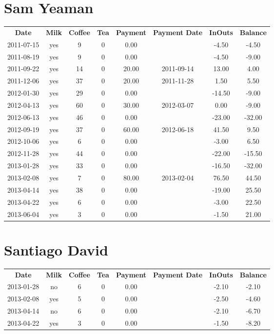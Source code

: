 \section{Sam Yeaman}

\begin{center}
\begin{tabular}{cccccccc}
\textbf{Date} & \textbf{Milk} & \textbf{Coffee} & \textbf{Tea} & \textbf{Payment} & \textbf{Payment Date} & \textbf{InOuts} & \textbf{Balance} \\
2011-07-15 & yes &  9 & 0 &  0.00 &  &  -4.50 &  -4.50\\ 
2011-08-19 & yes &  9 & 0 &  0.00 &  &  -4.50 &  -9.00\\ 
2011-09-22 & yes & 14 & 0 & 20.00 & 2011-09-14 &  13.00 &   4.00\\ 
2011-12-06 & yes & 37 & 0 & 20.00 & 2011-11-28 &   1.50 &   5.50\\ 
2012-01-30 & yes & 29 & 0 &  0.00 &  & -14.50 &  -9.00\\ 
2012-04-13 & yes & 60 & 0 & 30.00 & 2012-03-07 &   0.00 &  -9.00\\ 
2012-06-13 & yes & 46 & 0 &  0.00 &  & -23.00 & -32.00\\ 
2012-09-19 & yes & 37 & 0 & 60.00 & 2012-06-18 &  41.50 &   9.50\\ 
2012-10-06 & yes &  6 & 0 &  0.00 &  &  -3.00 &   6.50\\ 
2012-11-28 & yes & 44 & 0 &  0.00 &  & -22.00 & -15.50\\ 
2013-01-28 & yes & 33 & 0 &  0.00 &  & -16.50 & -32.00\\ 
2013-02-08 & yes &  7 & 0 & 80.00 & 2013-02-04 &  76.50 &  44.50\\ 
2013-04-14 & yes & 38 & 0 &  0.00 &  & -19.00 &  25.50\\ 
2013-04-22 & yes &  6 & 0 &  0.00 &  &  -3.00 &  22.50\\ 
2013-06-04 & yes &  3 & 0 &  0.00 &  &  -1.50 &  21.00
\end{tabular}
\end{center}

\section{Santiago David}

\begin{center}
\begin{tabular}{cccccccc}
\textbf{Date} & \textbf{Milk} & \textbf{Coffee} & \textbf{Tea} & \textbf{Payment} & \textbf{Payment Date} & \textbf{InOuts} & \textbf{Balance} \\
2013-01-28 & no & 6 & 0 & 0.00 &  & -2.10 & -2.10\\ 
2013-02-08 & yes & 5 & 0 & 0.00 &  & -2.50 & -4.60\\ 
2013-04-14 & no & 6 & 0 & 0.00 &  & -2.10 & -6.70\\ 
2013-04-22 & yes & 3 & 0 & 0.00 &  & -1.50 & -8.20
\end{tabular}
\end{center}


